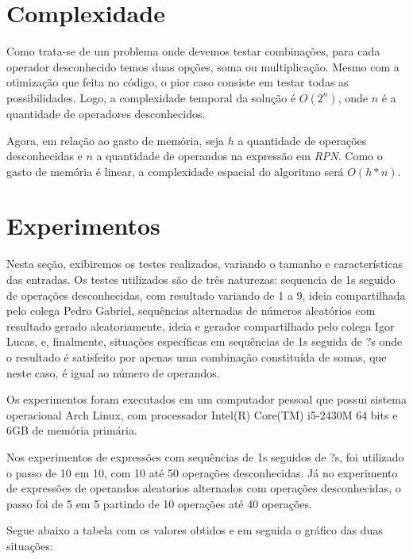 \documentclass[
12pt,
a4paper,
twoside,
brazil
]{article}
\begin{document}
	
	\section{Complexidade}
	
	Como trata-se de um problema onde devemos testar combinações, para cada operador desconhecido temos duas opções, soma ou multiplicação. Mesmo com a otimização que feita no código, o pior caso consiste em testar todas as possibilidades. Logo, a complexidade temporal da solução é $O(2^n)$, onde $n$ é a quantidade de operadores desconhecidos.
	
	Agora, em relação ao gasto de memória, seja $h$ a quantidade de operações desconhecidas e $n$ a quantidade de operandos na expressão em \textit{RPN}. Como o gasto de memória é linear, a complexidade espacial do algoritmo será $O(h*n)$.
	
	\section{Experimentos}
	
	Nesta seção, exibiremos os testes realizados, variando o tamanho e características das entradas. Os testes utilizados são de três naturezas: sequencia de 1s seguido de operações desconhecidas, com resultado variando de 1 a 9, ideia compartilhada pelo colega Pedro Gabriel, sequências alternadas de números aleatórios com resultado gerado aleatoriamente, ideia e gerador compartilhado pelo colega Igor Lucas, e, finalmente, situações específicas em sequências de 1s seguida de ?s onde o resultado é satisfeito por apenas uma combinação constituída de somas, que neste caso, é igual ao número de operandos.
	
	Os experimentos foram executados em um computador pessoal que possui sistema operacional Arch Linux, com processador Intel(R) Core(TM) i5-2430M 64 bits e 6GB de memória primária.
	
	Nos experimentos de expressões com sequências de 1s seguidos de ?s, foi utilizado o passo de 10 em 10, com 10 até 50 operações desconhecidas. Já no experimento  de expressões de operandos aleatorios alternados com operações desconhecidas, o passo foi de 5 em 5 partindo de 10 operações até 40 operações.
	
	Segue abaixo a tabela com os valores obtidos e em seguida o gráfico das duas situações:
	
\end{document}
